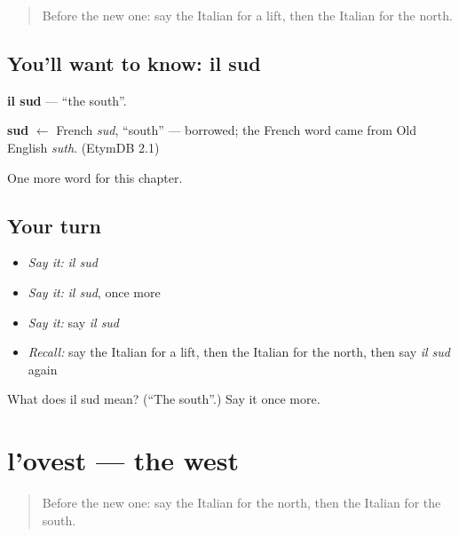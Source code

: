 \label{lesson:IT-C90-sud}



\begin{quote}
Before the new one: say the Italian for a lift, then the Italian for the north.
\end{quote}

\subsection*{You'll want to know: il sud}
\textbf{il sud} — \textquotedblleft{}the south\textquotedblright{}.

\begin{cousinweb}
\textbf{sud} $\leftarrow$ French \emph{sud}, \textquotedblleft{}south\textquotedblright{} — borrowed; the French word came from Old English \emph{suth}. (EtymDB 2.1)
\end{cousinweb}

\begin{grammarlens}[title={What you've built}]
One more word for this chapter.
\end{grammarlens}

\subsection*{Your turn}
\begin{itemize}
\raggedright
  \item \emph{Say it:} \emph{il sud}
  \item \emph{Say it:} \emph{il sud}, once more
  \item \emph{Say it:} say \emph{il sud}
  \item \emph{Recall:} say the Italian for a lift, then the Italian for the north, then say \emph{il sud} again
\end{itemize}

\begin{tcolorbox}[breakable,colback=teal!4,colframe=teal!35!black,title={Before you move on}]
What does il sud mean? (\textquotedblleft{}The south\textquotedblright{}.) Say it once more.
\end{tcolorbox}
\section[l'ovest]{l'ovest — the west}

\label{lesson:IT-C90-ovest}



\begin{quote}
Before the new one: say the Italian for the north, then the Italian for the south.
\end{quote}

